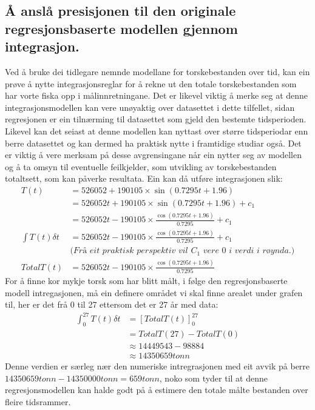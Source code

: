 \documentclass{report}
\begin{document}
\subsection{Å anslå presisjonen til den originale regresjonsbaserte modellen gjennom integrasjon.}
Ved å bruke dei tidlegare nemnde modellane for torskebestanden over tid, kan ein prøve å nytte integrasjonsreglar for å rekne ut den totale torskebestanden som har vorte fiska opp i målinnretningane.
Det er likevel viktig å merke seg at denne integrasjonsmodellen kan vere unøyaktig over datasettet i dette tilfellet, sidan regresjonen er ein tilnærming til datasettet som gjeld den bestemte tidsperioden.
Likevel kan det seiast at denne modellen kan nyttast over større tidsperiodar enn berre datasettet og kan dermed ha praktisk nytte i framtidige studiar også.
Det er viktig å vere merksam på desse avgrensingane når ein nytter seg av modellen og å ta omsyn til eventuelle feilkjelder, som utvikling av torskebestanden totaltsett, som kan påverke resultata.
Ein kan då utføre integrasjonen slik:
\begin{align*}
	T(t)              & = 526052+190105\times \sin(0.7295t+1.96)                                  \\
	                  & = 526052t+190105\times\sin(0.7295t+1.96)+c_{1}                            \\
	                  & = 526052t-190105\times\frac{\cos(0.7295t+1.96)}{0.7295}+c_{1}             \\
	\int T(t)\delta t & =526052t-190105\times\frac{\cos(0.7295t+1.96)}{0.7295}+c_{1}              \\
	                  & \textit{(Frå eit praktisk perspektiv vil $C_1$ vere 0 i verdi i røynda.)} \\
	TotalT(t)         & =526052t-190105\times\frac{\cos(0.7295t+1.96)}{0.7295}
\end{align*}
For å finne kor mykje torsk som har blitt målt, i følge den regresjonsbaserte modell intregasjonen, må ein definere området vi skal finne arealet under grafen til, her er det frå 0 til 27 ettersom det er 27 år med data:
\begin{align*}
	\int_{0}^{27}T(t) \delta t & = [TotalT(t)]_{0}^{27} \\
	                           & = TotalT(27)-TotalT(0) \\
	                           & \approx 14449543-98884 \\
	                           & \approx 14350659tonn
\end{align*}
Denne verdien er særleg nær den numeriske intregrasjonen med eit avvik på berre $14350659tonn-14350000tonn=659tonn$, noko som tyder til at denne regresjonsmodellen kan halde godt på å estimere den totale målte bestanden over fleire tidsrammer.
\end{document}
